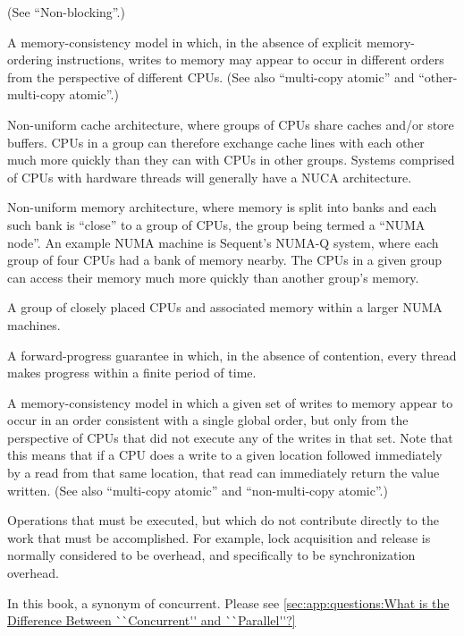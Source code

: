 \begin{description}
	(See ``Non-blocking''.)
\item[\IXGhy{Non-}{Multi-Copy Atomic}:]
	A memory-consistency model in which, in the absence of explicit
	memory-ordering instructions, writes to memory may appear to
	occur in different orders from the perspective of different CPUs.
	(See also ``multi-copy atomic'' and ``other-multi-copy atomic''.)
\item[NUCA:]
	Non-uniform cache architecture, where groups of CPUs share
	caches and/or store buffers.
	CPUs in a group can therefore exchange cache lines with each
	other much more quickly than they can with CPUs in other groups.
	Systems comprised of CPUs with hardware threads will generally
	have a NUCA architecture.
\item[NUMA:]
	Non-uniform memory architecture, where memory is split into
	banks and each such bank is ``close'' to a group of CPUs,
	the group being termed a ``NUMA node''.
	An example NUMA machine is Sequent's NUMA-Q system, where
	each group of four CPUs had a bank of memory nearby.
	The CPUs in a given group can access their memory much
	more quickly than another group's memory.
\item[\IXGaltr{NUMA Node}{NUMA node}:]
	A group of closely placed CPUs and associated memory within
	a larger NUMA machines.
\item[\IXG{Obstruction Free}:]
	A forward-progress guarantee in which, in the absence of
	contention, every thread makes progress within a finite
	period of time.
\item[\IXGhy{Other-}{Multi-Copy Atomic}:]
	A memory-consistency model in which a given set of writes to
	memory appear to occur in an order consistent with a single
	global order, but only from the perspective of CPUs that did
	not execute any of the writes in that set.
	Note that this means that if a CPU does a write to a given
	location followed immediately by a read from that same location,
	that read can immediately return the value written.
	(See also ``multi-copy atomic'' and ``non-multi-copy atomic''.)
\item[\IXG{Overhead}:]
	Operations that must be executed, but which do not contribute
	directly to the work that must be accomplished.
	For example, lock acquisition and release is normally considered
	to be overhead, and specifically to be synchronization overhead.
\item[\IXG{Parallel}:]
	In this book, a synonym of concurrent.
	Please see \cref{sec:app:questions:What is the Difference Between ``Concurrent'' and ``Parallel''?}

\end{description}
